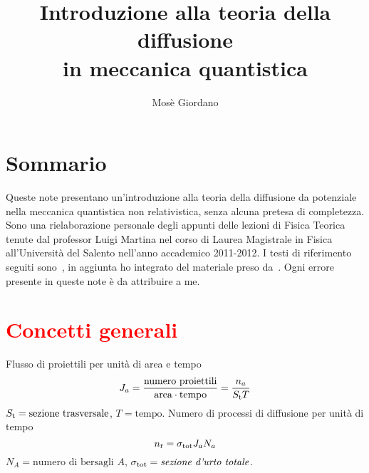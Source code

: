 \documentclass[a4paper,fleqn,twoside,12pt]{article}
\title{Introduzione alla teoria della diffusione \\ in meccanica quantistica}
\author{Mosè Giordano}
\newcommand{\completare}[1]{\textcolor{red}{#1}}
\begin{document}
\maketitle
{\small\tableofcontents}

{}
\section*{Sommario}
\label{sec:sommario}

Queste note presentano un'introduzione alla teoria della diffusione da
potenziale nella meccanica quantistica non relativistica, senza alcuna pretesa
di completezza.  Sono una rielaborazione personale degli appunti delle lezioni
di Fisica Teorica tenute dal professor Luigi Martina nel corso di Laurea
Magistrale in Fisica all'Università del Salento nell'anno accademico 2011-2012.
I testi di riferimento seguiti
sono~\textcites{ballentine:quantum-mechanics,cohen:quantum-mechanics}, in
aggiunta ho integrato del materiale preso
da~\textcites{gottfried:quantum-mechanics,griffiths:introduction-qm}.  Ogni
errore presente in queste note è da attribuire a me.

\section{\completare{Concetti generali}}
\label{sec:concetti-generali}

Flusso di proiettili per unità di area e tempo
\begin{equation}
  J_{a} = \frac{\text{numero proiettili}}{\text{area}\cdot\text{tempo}} =
  \frac{n_{a}}{S_{\textup{t}} T}
\end{equation}
$S_{\textup{t}} = \text{sezione trasversale}$, $T = \text{tempo}$.  Numero di
processi di diffusione per unità di tempo
\begin{equation}
  n_{t} = \sigma_{\textup{tot}} J_{a} N_{a}
\end{equation}
$N_{A} = \text{numero di bersagli $A$}$,
$\sigma_{\textup{tot}} = \text{\emph{sezione d'urto totale}}$.
\end{document}
